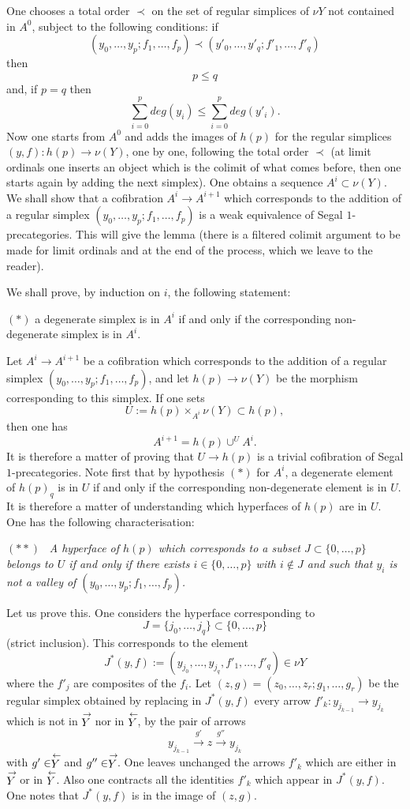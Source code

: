 One chooses a total order $\prec$ on the set of regular simplices of
$\nu Y$ not contained in $A^0$, subject to the following conditions: if
$$
(y_0,\ldots , y_p; f_1,\ldots , f_p) \prec
(y'_0,\ldots , y'_q; f'_1,\ldots , f'_q)
$$
then
$$
p\leq q
$$
and, if $p=q$ then
$$
\sum _{i=0}^p deg (y_i) \leq \sum _{i=0}^p deg(y'_i).
$$
Now one starts from $A^0$ and adds the images of $h(p)$ for the
regular simplices $(y,f): h(p)\rightarrow \nu (Y)$, one by one, following
the total order $\prec$ (at limit ordinals one inserts an object which is the
colimit of what comes before, then one starts again by adding the next
simplex). One obtains a sequence $A^i\subset \nu (Y)$. We shall show that a
cofibration $A^i\rightarrow A^{i+1}$ which corresponds to the addition of a
regular simplex $(y_0,\ldots , y_p; f_1,\ldots , f_p)$ is a
weak equivalence of Segal $1$-precategories. This will give the lemma
(there is a filtered colimit argument to be made for limit ordinals and
at the end of the process, which we leave to the reader).


We shall prove, by induction on $i$, the following statement:

$(\ast )$ a degenerate simplex
is in $A^i$ if and only if the corresponding non-degenerate simplex
is in $A^i$.

Let $A^i\rightarrow A^{i+1}$ be a cofibration which corresponds to
the addition of a regular simplex $(y_0,\ldots , y_p; f_1,\ldots , f_p)$, and
let $h(p)\rightarrow \nu (Y)$ be the morphism corresponding to this simplex.
If one sets
$$
U:= h(p)\times _{A^i} \nu (Y) \subset h(p),
$$
then one has
$$
A^{i+1} = h(p)\cup ^U A^i.
$$
It is therefore a matter of proving that $U\rightarrow h(p)$ is a trivial
cofibration of Segal $1$-precategories. Note first that by hypothesis $(\ast )$ for
$A^i$, a degenerate element of $h(p)_q$ is in $U$ if and only
if the corresponding non-degenerate element is in $U$. It is therefore
a matter of understanding which hyperfaces of $h(p)$ are in $U$. One has the
following characterisation:

$(\ast \ast )$ \, {\em A hyperface of $h(p)$ which corresponds to a
subset $J\subset \{ 0,\ldots , p\}$ belongs to $U$ if and only
if there exists $i\in \{ 0,\ldots , p\}$ with $i\not \in J$ and such that $y_i$
is not a
valley of $(y_0,\ldots , y_p; f_1,\ldots , f_p)$.}


Let us prove this. One considers the hyperface corresponding to
$$
J= \{j_0,\ldots ,
j_q\} \subset \{ 0,\ldots , p\}
$$
(strict inclusion). This corresponds to
the element
$$
J^{\ast}(y,f):=(y_{j_0}, \ldots , y_{j_q}, f'_1,\ldots , f'_q)\in \nu Y
$$
where
the $f'_j$ are composites of the $f_i$. Let $(z,g)=(z_0,\ldots , z_r;
g_1,\ldots , g_r)$ be the regular simplex obtained by replacing in
$J^{\ast}(y,f)$ every arrow $f'_k: y_{j_{k-1}}\rightarrow y_{j_k}$ which is
not
in $\stackrel{\rightarrow}{Y}$ nor in $\stackrel{\leftarrow}{Y}$, by the pair of arrows
$$
y_{j_{k-1}}\stackrel{g'}{\rightarrow}z\stackrel{g''}{\rightarrow} y_{j_k}
$$
with $g'\in \stackrel{\leftarrow}{Y}$ and $g''\in \stackrel{\rightarrow}{Y}$.
One leaves unchanged the
arrows $f'_k$ which are either in $\stackrel{\rightarrow}{Y}$ or in
$\stackrel{\leftarrow}{Y}$.
Also one contracts all the identities $f'_k$ which appear in
$J^{\ast}(y,f)$. One notes that $J^{\ast}(y,f)$ is in the image of $(z,g)$.

